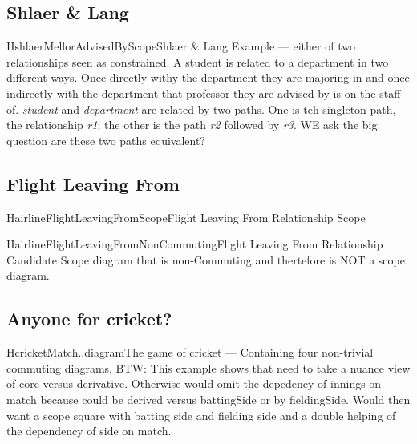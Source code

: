 \subsection{Shlaer \& Lang}
\begin{erboxedFigure}{H}{shlaerMellorAdvisedByScope}{Shlaer \& Lang Example --- either of two relationships seen as constrained. A student is related to a department in two different ways. Once directly withy the department they are majoring in and once indirectly with the department that professor they are advised by is on the staff of. \textit{student} and \textit{department} are related by two paths. One is teh singleton path, the relationship \textit{r1}; the other is the path \textit{r2} followed by \textit{r3}. WE ask the big question are these two paths equivalent?}

\end{erboxedFigure}

\subsection{Flight Leaving From}
\begin{erboxedFigure}{H}{airlineFlightLeavingFromScope}{Flight Leaving From Relationship Scope}

\end{erboxedFigure}

\begin{erboxedFigure}{H}{airlineFlightLeavingFromNonCommuting}{Flight Leaving From Relationship Candidate Scope diagram that is non-Commuting and thertefore is NOT a scope diagram.}

\end{erboxedFigure}





\subsection{Anyone for cricket?}

\begin{erboxedFigure}{H}{cricketMatch..diagram}{The game of cricket --- Containing four non-trivial commuting diagrams. BTW: This example shows that need to take a nuance view of core versus derivative. Otherwise would omit the depedency of innings on match
because could be derived versus battingSide or by fieldingSide. Would then want a scope square with batting side and fielding side and a double helping of the dependency of side on match.}

\end{erboxedFigure}

